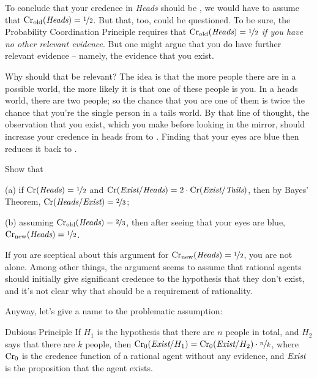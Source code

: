 {To conclude that your credence in \emph{Heads}
should be , we would have to assume that
$\text{Cr}_\text{old}(\emph{Heads}) = \nicefrac{1}{2}$. But that, too, could
be questioned. To be sure, the Probability Coordination Principle
requires that $\text{Cr}_\text{old}(\emph{Heads}) = \nicefrac{1}{2}$
\emph{if you have no other relevant evidence}. But one might argue
that you do have further relevant evidence -- namely, the evidence
that you exist.

Why should that be relevant? The idea is that the more people there
are in a possible world, the more likely it is that one of these
people is you. In a heads world, there are two people; so the chance
that you are one of them is twice the chance that you're the single
person in a tails world. By that line of thought, the observation that
you exist, which you make before looking in the mirror, should
increase your credence in heads from  to
. Finding that your eyes are blue then reduces it back to
.

\begin{exercise}{2}
  Show that
  \begin{enumerate*}
  \item[(a)] if $\text{Cr}(\emph{Heads}) = \nicefrac{1}{2}$ and
    $\text{Cr}(\emph{Exist}/\emph{Heads}) = 2 \cdot
    \text{Cr}(\emph{Exist}/\emph{Tails})$, then by Bayes' Theorem,
    $\text{Cr}(\emph{Heads}/\emph{Exist}) = \nicefrac{2}{3}$;
  \item[(b)] assuming
    $\text{Cr}_\text{old}(\emph{Heads}) = \nicefrac{2}{3}$, then after
    seeing that your eyes are blue,
    $\text{Cr}_\text{new}(\emph{Heads}) = \nicefrac{1}{2}$.
  \end{enumerate*}
  \vspace{-5mm}
\end{exercise}

If you are sceptical about this argument for $\text{Cr$_{\text{new}}$}(\emph{Heads}) =
\nicefrac{1}{2}$, you are not alone. Among other things, the argument seems to
assume that rational agents should initially give significant credence
to the hypothesis that they don't exist, and it's not clear why that
should be a requirement of rationality.

Anyway, let's give a name to the problematic assumption:
\begin{genericthm}{Dubious Principle}
  If $H_1$ is the hypothesis that there are $n$ people in total, and
  $H_2$ says that there are $k$ people, then $\text{Cr}_0(\emph{Exist} /
  H_1) = \text{Cr}_0(\emph{Exist}/H_2) \cdot \nicefrac{n}{k}$, where $\text{Cr}_0$
  is the credence function of a rational agent without any evidence,
  and $\emph{Exist}$ is the proposition that the agent exists.
\end{genericthm}

}
